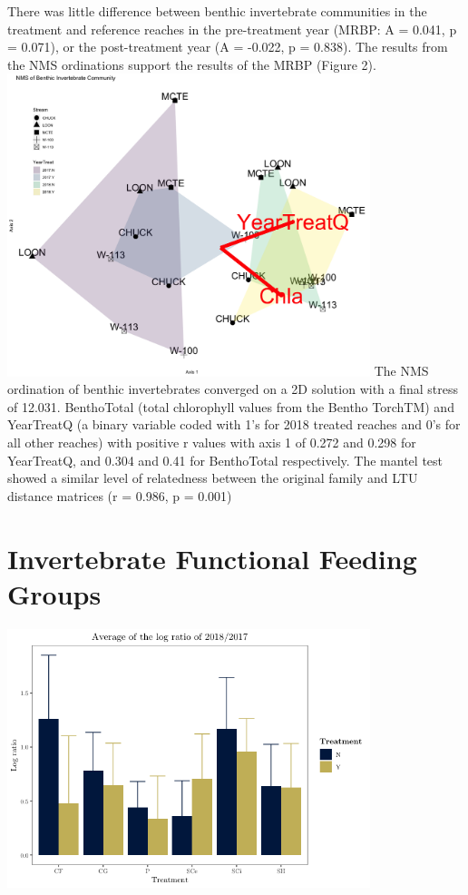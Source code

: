 \documentclass[double,12pt]{beavtex}
\begin{document}
  There was little difference between benthic invertebrate communities in
  the treatment and reference reaches in the pre-treatment year (MRBP: A =
  0.041, p = 0.071), or the post-treatment year (A = -0.022, p = 0.838).
  The results from the NMS ordinations support the results of the MRBP
  (Figure 2). \includegraphics[width=4.16667in]{Figures/NMS Benthic-1.png}
  The NMS ordination of benthic invertebrates converged on a 2D solution
  with a final stress of 12.031. BenthoTotal (total chlorophyll values
  from the Bentho TorchTM) and YearTreatQ (a binary variable coded with
  1's for 2018 treated reaches and 0's for all other reaches) with
  positive r values with axis 1 of 0.272 and 0.298 for YearTreatQ, and
  0.304 and 0.41 for BenthoTotal respectively. The mantel test showed a
  similar level of relatedness between the original family and LTU
  distance matrices (r = 0.986, p = 0.001)
  
  \section*{Invertebrate Functional Feeding
  Groups}\label{invertebrate-functional-feeding-groups}
  
  \includegraphics[width=4.16667in]{Figures/AvgFFGratio-1.png}
  
\end{document}
